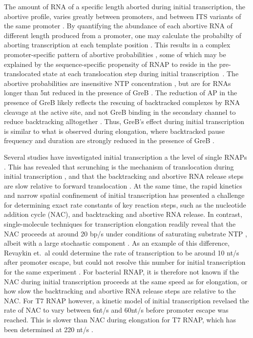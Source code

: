 The amount of RNA of a specific length aborted during initial transcription,
the abortive profile, varies greatly between promoters, and between ITS
variants of the same promoter \cite{hsu_promoter_2002}. By quantifying the
abundance of each abortive RNA of different length produced from a promoter,
one may calculate the probabilty of aborting transcription at each template
position \cite{hsu_quantitative_1996}. This results in a complex
promoter-specific pattern of abortive probabilities
\cite{hsu_initial_2006,hsu_vitro_2003}, some of which may be explained by the
sequence-specific propensity of RNAP to reside in the pre-translocated state
at each translocation step during initial
transcription~\cite{skancke_sequence-dependent_2015}. The abortive
probabilities are insensitive NTP concentration \cite{hsu_vitro_2004}, but are
for RNAs longer than 5nt reduced in the presence of GreB
\cite{hsu_initial_2003}. The reduction of AP in the presence of GreB likely
reflects the rescuing of backtracked complexes by RNA cleavage at the active
site, and not GreB binding in the secondary channel to reduce backtracking
alltogether \cite{opalka_structure_2003, hsu_initial_2006}. Thus, GreB's
effect during initial transcription is similar to what is observed during
elongation, where backtracked pause frequency and duration are strongly
reduced in the presence of GreB \cite{shaevitz_backtracking_2003}.

Several studies have investigated initial transcription a the level of single
RNAPs \cite{kapanidis_retention_2005, margeat_direct_2006,
revyakin_abortive_2006, tang_real-time_2009, kapanidis_initial_2006}. This has
revealed that scrunching is the mechanism of translocation during initial
transcription \cite{revyakin_abortive_2006, kapanidis_initial_2006}, and that
the backtracking and abortive RNA release steps are slow relative to forward
translocation \cite{margeat_direct_2006, revyakin_abortive_2006}. At the same
time, the rapid kinetics and narrow spatial confinement of initial
transcription has presented a challenge for determining exact rate constants
of key reaction steps, such as the nucleotide addition cycle (NAC), and
backtracking and abortive RNA release. In contrast, single-molecule techniques
for transcription elongation readily reveal that the NAC proceeds at around 20
bp/s under conditions of saturating substrate NTP
\cite{bai_mechanochemical_2007, mejia_trigger_2014}, albeit with a large
stochastic component \cite{tolic-norrelykke_diversity_2004}. As an example of
this difference, Revaykin et.\ al could determine the rate of transcription
to be around 10 nt/s after promoter escape, but could not resolve this number
for initial transcription for the same experiment
\cite{revyakin_abortive_2006}. For bacterial RNAP, it is therefore not known
if the NAC during initial transcription proceeds at the same speed as for
elongation, or how slow the backtracking and abortive RNA release steps are
relative to the NAC. For T7 RNAP however, a kinetic model of initial
transcription revelaed the rate of NAC to vary between 6nt/s and 60nt/s before
promoter escape was reached. This is slower than NAC during elongation for T7
RNAP, which has been determined at 220 nt/s \cite{anand_transient_2006}.

